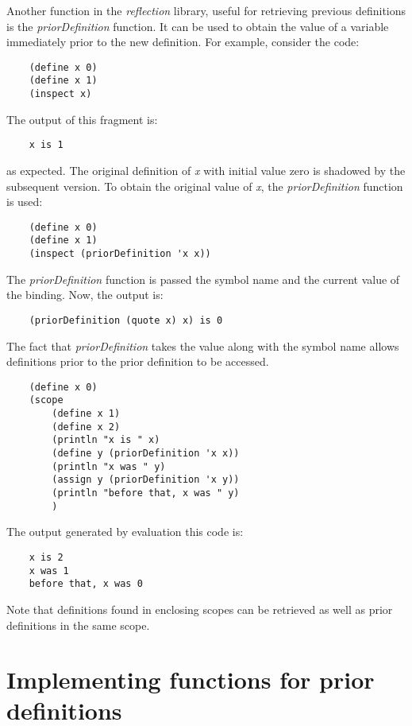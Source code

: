 Another function in the {\it reflection} library, useful for retrieving previous definitions is
the {\it priorDefinition} function. It can be used to obtain the value
of a variable immediately prior to the new definition. For
example, consider the code:

\begin{verbatim}
    (define x 0)
    (define x 1)
    (inspect x)
\end{verbatim}

The output of this fragment is:

\begin{verbatim}
    x is 1
\end{verbatim}

as expected. The original definition of {\it x} with initial value zero
is shadowed by the subsequent version. To obtain the original value
of {\it x}, the {\it priorDefinition} function is used:

\begin{verbatim}
    (define x 0)
    (define x 1)
    (inspect (priorDefinition 'x x))
\end{verbatim}

The {\it priorDefinition} function is passed the symbol name and the current
value of the binding. Now, the output is:

\begin{verbatim}
    (priorDefinition (quote x) x) is 0
\end{verbatim}

The fact that {\it priorDefinition} takes the value along with the symbol
name allows definitions prior to the prior definition to be accessed.

\begin{verbatim}
    (define x 0)
    (scope
        (define x 1)
        (define x 2)
        (println "x is " x)
        (define y (priorDefinition 'x x))
        (println "x was " y)
        (assign y (priorDefinition 'x y))
        (println "before that, x was " y)
        )
\end{verbatim}

The output generated by evaluation this code is:

\begin{verbatim}
    x is 2
    x was 1
    before that, x was 0
\end{verbatim}

Note that definitions found in enclosing scopes can be retrieved
as well as prior definitions in the same scope.

\section{Implementing functions for prior definitions}

